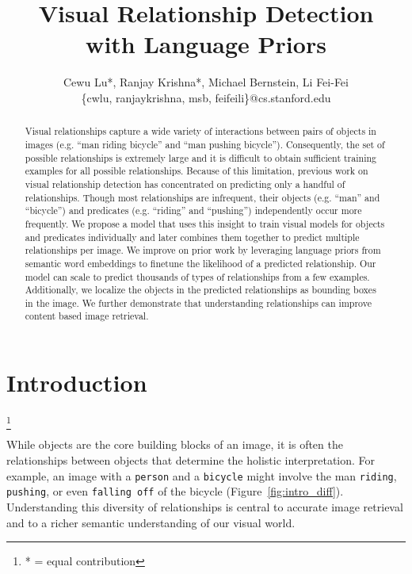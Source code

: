 \documentclass[runningheads]{llncs}
\newcommand{\eg}[1]{e.g. #1}
\newcommand\blfootnote[1]{\begingroup
  \renewcommand\thefootnote{}\footnote{#1}\addtocounter{footnote}{-1}\endgroup
}
\begin{document}
\pagestyle{headings}
\mainmatter

\title{Visual Relationship Detection \\ with Language Priors} 



\author{Cewu Lu*, Ranjay Krishna*, Michael Bernstein, Li Fei-Fei \\ 
\small{\{cwlu, ranjaykrishna, msb, feifeili\}@cs.stanford.edu}}



\maketitle
\begin{abstract}
Visual relationships capture a wide variety of interactions between pairs of objects in images (\eg ``man riding bicycle'' and ``man pushing bicycle''). Consequently, the set of possible relationships is extremely large and it is difficult to obtain sufficient training examples for all possible relationships. Because of this limitation, previous work on visual relationship detection has concentrated on predicting only a handful of relationships. Though most relationships are infrequent, their objects (\eg ``man'' and ``bicycle'') and predicates (\eg ``riding'' and ``pushing'') independently occur more frequently. We propose a model that uses this insight to train visual models for objects and predicates individually and later combines them together to predict multiple relationships per image. We improve on prior work by leveraging language priors from semantic word embeddings to finetune the likelihood of a predicted relationship. Our model can scale to predict thousands of types of relationships from a few examples. Additionally, we localize the objects in the predicted relationships as bounding boxes in the image. We further demonstrate that understanding relationships can improve content based image retrieval.
\end{abstract}

\section{Introduction}
\blfootnote{* = equal contribution}
While objects are the core building blocks of an image, it is often the relationships between objects that determine the holistic interpretation. For example, an image with a \texttt{person} and a \texttt{bicycle} might involve the man \texttt{riding}, \texttt{pushing}, or even \texttt{falling off} of the bicycle (Figure~\ref{fig:intro_diff}). Understanding this diversity of relationships is central to accurate image retrieval and to a richer semantic understanding of our visual world.
\end{document}
